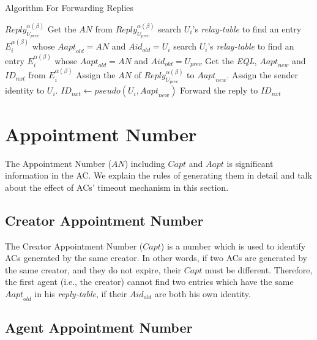 \begin{algorithm} [hbtp]
\caption{Algorithm For Forwarding Replies}\label{AlgACPForwardReply}
\begin{algorithmic}[1]
 {${Reply}_{U_{prev}}^{\alpha\left(\beta\right)}$}
\State Get the $AN$ from ${Reply}_{U_{prev}}^{\alpha\left(\beta\right)}$
	\State search $U_i$’s \textit{relay-table} to find an entry $E_i^{\alpha\left(\beta\right)}$
	\State whose ${Aapt}_{old}=AN$ and ${Aid}_{old}=U_i$
\Else
	\State search $U_i$’s \textit{relay-table} to find an entry $E_i^{\alpha\left(\beta\right)}$
	\State whose ${Aapt}_{old}=AN$ and ${Aid}_{old}=U_{prev}$	
\EndIf
\State Get the \textit{EQL}, ${Aapt}_{new}$ and ${ID}_{nxt}$ from $E_i^{\alpha\left(\beta\right)}$
\State Assign the $AN$ of ${Reply}_{U_{prev}}^{\alpha\left(\beta\right)}$ to ${Aapt}_{new}$.
\State Assign the sender identity to $U_i$.
	\State ${ID}_{nxt}\gets pseudo\left(U_i,{Aapt}_{new}\right)$
\EndIf
\State Forward the reply to ${ID}_{nxt}$
\EndProcedure

\end{algorithmic}
\end{algorithm}

\section{ Appointment Number}

\noindent The Appointment Number ($AN$) including $Capt$ and $Aapt$ is significant information in the AC. We explain the rules of generating them in detail and talk about the effect of ACs' timeout mechanism in this section.


\subsection{  Creator Appointment Number}

\noindent The Creator Appointment Number ($Capt$) is a number which is used to identify ACs generated by the same creator. In other words, if two ACs are generated by the same creator, and they do not expire, their $Capt$ must be different. Therefore, the first agent (i.e., the creator) cannot find two entries which have the same ${Aapt}_{old}$ in his \textit{reply-table}, if their ${Aid}_{old}$ are both his own identity.


\subsection{ Agent Appointment Number}

